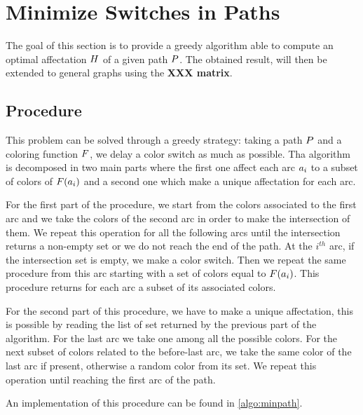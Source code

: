 \section{Minimize Switches in Paths}

The goal of this section is to provide a greedy algorithm able to compute an optimal affectation $H$ of a given path $P$. The obtained result, will then be extended to general graphs using the \textbf{XXX matrix}.

\subsection{Procedure}
\label{sec:path_proc}
This problem can be solved through a greedy strategy: taking a path $P$ and a coloring function $F$, we delay a color switch as much as possible. Tha algorithm is decomposed in two main parts where the first one affect each arc $a_i$ to a subset of colors of $F(a_i)$ and a second one which make a unique affectation for each arc.

For the first part of the procedure, we start from the colors associated to the first arc and we take the colors of the second arc in order to make the intersection of them. We repeat this operation for all the following arcs until the intersection returns a non-empty set or we do not reach the end of the path. At the $i^{th}$ arc, if the intersection set is empty, we make a color switch. Then we repeat the same procedure from this arc starting with a set of colors equal to $F(a_i)$. This procedure returns for each arc a subset of its associated colors.

For the second part of this procedure, we have to make a unique affectation, this is possible by reading the list of set returned by the previous part of the algorithm. For the last arc we take one among all the possible colors. For the next subset of colors related to the before-last arc, we take the same color of the last arc if present, otherwise a random color from its set. We repeat this operation until reaching the first arc of the path.

An implementation of this procedure can be found in \cref{algo:minpath}.


